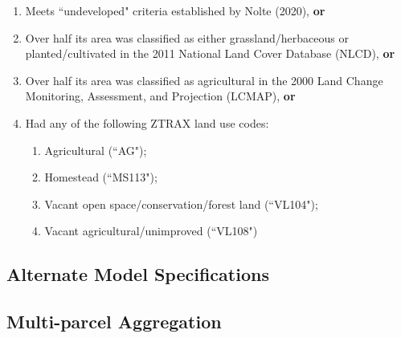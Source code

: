 \documentclass[12pt]{article}
\begin{document}
\begin{enumerate}
    \item Meets ``undeveloped" criteria established by Nolte (2020), \textbf{or}
    \item Over half its area was classified as either grassland/herbaceous or planted/cultivated in the 2011 National Land Cover Database (NLCD), \textbf{or}
    \item Over half its area was classified as agricultural in the 2000 Land Change Monitoring, Assessment, and Projection (LCMAP), \textbf{or}
    \item Had any of the following ZTRAX land use codes:
    \begin{enumerate}
        \item Agricultural (``AG");
        \item Homestead (``MS113");
        \item Vacant open space/conservation/forest land (``VL104");
        \item Vacant agricultural/unimproved (``VL108")
    \end{enumerate}
\end{enumerate}

\subsection{Alternate Model Specifications}


\subsection{Multi-parcel Aggregation}



\newpage


\printbibliography
\end{document}
